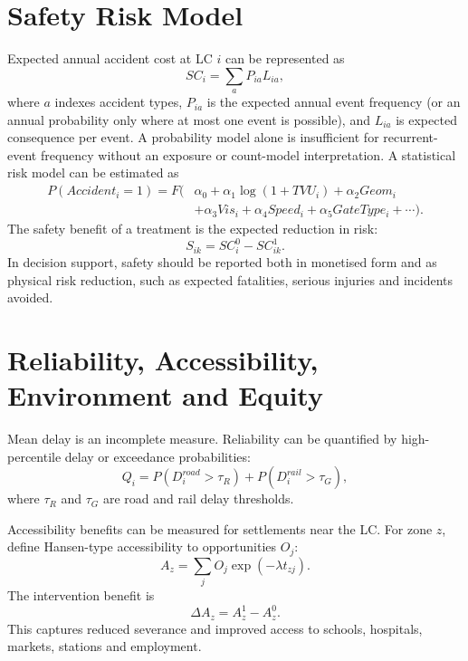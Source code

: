 \documentclass[11pt,a4paper]{article}
\begin{document}
\section{Safety Risk Model}

Expected annual accident cost at LC $i$ can be represented as
\begin{equation}
SC_i=\sum_a P_{ia}L_{ia},
\end{equation}
where $a$ indexes accident types, $P_{ia}$ is the expected annual event frequency (or an annual probability only where at most one event is possible), and $L_{ia}$ is expected consequence per event. A probability model alone is insufficient for recurrent-event frequency without an exposure or count-model interpretation. A statistical risk model can be estimated as
\begin{equation}
\begin{split}
P(Accident_i=1)=F(&\alpha_0+\alpha_1\log(1+TVU_i)+\alpha_2Geom_i \\ &+\alpha_3Vis_i+\alpha_4Speed_i+\alpha_5GateType_i+\cdots).
\end{split}
\end{equation}
The safety benefit of a treatment is the expected reduction in risk:
\begin{equation}
S_{ik}=SC_i^0-SC_{ik}^1.
\end{equation}
In decision support, safety should be reported both in monetised form and as physical risk reduction, such as expected fatalities, serious injuries and incidents avoided.

\section{Reliability, Accessibility, Environment and Equity}

Mean delay is an incomplete measure. Reliability can be quantified by high-percentile delay or exceedance probabilities:
\begin{equation}
Q_i=P(D_i^{road}>\tau_R)+P(D_i^{rail}>\tau_G),
\end{equation}
where $\tau_R$ and $\tau_G$ are road and rail delay thresholds.

Accessibility benefits can be measured for settlements near the LC. For zone $z$, define Hansen-type accessibility to opportunities $O_j$:
\begin{equation}
A_z=\sum_j O_j \exp(-\lambda t_{zj}).
\end{equation}
The intervention benefit is
\begin{equation}
\Delta A_z=A_z^1-A_z^0.
\end{equation}
This captures reduced severance and improved access to schools, hospitals, markets, stations and employment.
\end{document}
